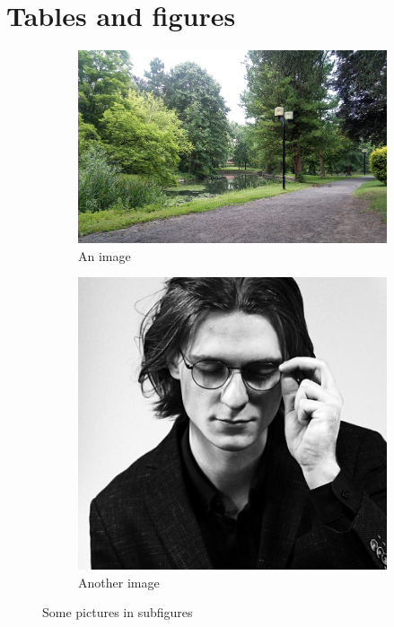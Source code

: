 \documentclass[a4, english]{article}
\begin{document}
\section{Tables and figures}
\begin{figure}[ht!] %
  \centering

  \begin{subfigure}{0.59\linewidth}
    \centering
    
    \includegraphics[width=\linewidth]{img/picture_1.jpg}
    
    \caption{An image}
    \label{fig example: sub figure 1}
  \end{subfigure}
  \begin{subfigure}{0.39\linewidth}
    \centering
    
    \includegraphics[width=\linewidth]{img/picture_2.jpg}
    
    \caption{Another image}
    \label{fig example: sub figure 2}
  \end{subfigure}


  \caption{Some pictures in subfigures}
  \label{FigExample}
\end{figure}
\end{document}
